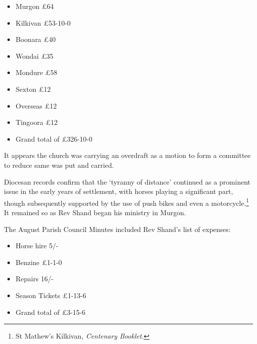\begin{itemize}

\item

  Murgon \pounds64

\item

  Kilkivan \pounds53-10-0

\item

  Boonara \pounds40

\item

  Wondai \pounds35

\item

  Mondure \pounds58

\item

  Sexton \pounds12

\item

  Overseas \pounds12

\item

  Tingoora \pounds12

\item

  Grand total of \pounds326-10-0

\end{itemize}



\smallskip


It appears the church was carrying an overdraft as a motion to form a committee to reduce same was put and carried.



Diocesan records confirm that the `tyranny of distance' continued as a prominent issue in the early years of settlement, with horses playing a significant part, though subsequently supported by the use of push bikes and even a motorcycle.\footnote{St Mathew's Kilkivan\emph{, Centenary Booklet.}} It remained so as Rev Shand began his ministry in Murgon.


The August Parish Council Minutes included Rev Shand's list of expenses:



\begin{itemize}

\item

  Horse hire 5/-

\item

  Benzine \pounds1-1-0

\item

  Repairs 16/-

\item

  Season Tickets \pounds1-13-6

\item

  Grand total of \pounds3-15-6

\end{itemize}



